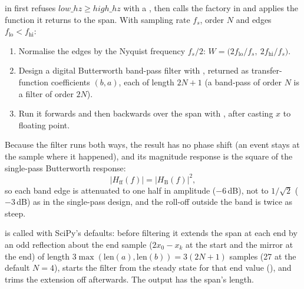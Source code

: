 in  first refuses
$\mathit{low\_hz} \geq \mathit{high\_hz}$ with a , then calls the factory
 in  and applies
the function it returns to the span. With sampling rate $f_s$, order $N$ and edges
$f_\mathrm{lo} < f_\mathrm{hi}$:
\begin{enumerate}
\item Normalise the edges by the Nyquist frequency $f_s/2$:
  $W = \bigl(2f_\mathrm{lo}/f_s,\ 2f_\mathrm{hi}/f_s\bigr)$.
\item Design a digital Butterworth band-pass filter \citep{butterworth1930theory} with
   \citep{virtanen2020scipy}, returned as
  transfer-function coefficients $(b, a)$, each of length $2N+1$ (a band-pass of order $N$ is a
  filter of order $2N$).
\item Run it forwards and then backwards over the span with
  , after casting $x$ to floating point.
\end{enumerate}
Because the filter runs both ways, the result has no phase shift (an event stays at the sample
where it happened), and its magnitude response is the square of the single-pass Butterworth
response:
\[ |H_\mathrm{ff}(f)| = |H_\mathrm{B}(f)|^2 , \]
so each band edge is attenuated to one half in amplitude ($-6$\,dB), not to $1/\sqrt2$
($-3$\,dB) as in the single-pass design, and the roll-off outside the band is twice as steep.

 is called with SciPy's defaults: before filtering it extends the span at each
end by an odd reflection about the end sample ($2x_0 - x_{k}$ at the start and the mirror at
the end) of length $3\max(\mathrm{len}(a), \mathrm{len}(b)) = 3(2N+1)$ samples (27 at the
default $N = 4$), starts the filter from the steady state for that end value
(), and trims the extension off afterwards. The output has the span's length.

